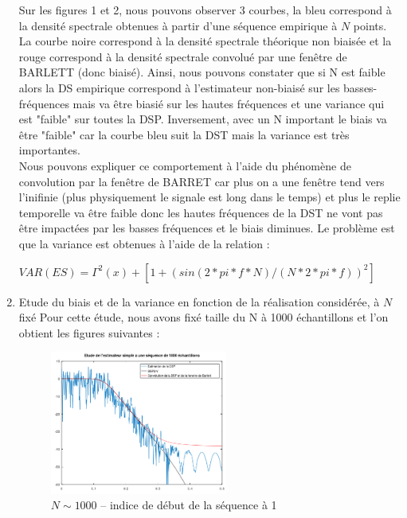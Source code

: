 \documentclass{article}
\begin{document}
\begin{enumerate}
Sur les figures 1 et 2, nous pouvons observer 3 courbes, la bleu correspond à la densité spectrale obtenues à partir d'une séquence empirique à $N$ points. La courbe noire correspond à la densité spectrale théorique non biaisée et la rouge correspond à la densité spectrale convolué par une fenêtre de BARLETT (donc biaisé). 
Ainsi, nous pouvons constater que si N est faible alors la DS empirique correspond à l'estimateur non-biaisé sur les basses-fréquences mais va être biasié sur les hautes fréquences et une variance qui est "faible" sur toutes la DSP.
Inversement, avec un N important le biais va être "faible" car la courbe bleu suit la DST mais la variance est très importantes. \\
Nous pouvons expliquer ce comportement à l'aide du phénomène de convolution par la fenêtre de BARRET car plus on a une fenêtre tend vers l'inifinie (plus physiquement le signale est long dans le temps) et plus le replie temporelle va être faible donc les hautes fréquences de la DST ne vont pas être impactées par les basses fréquences et le biais diminues. Le problème est que la variance est obtenues à l'aide de la relation :\\
\centerline{$VAR(ES) = \Gamma^2(x) + [1+(sin(2*pi*f*N)/(N*2*pi*f))^2]$}
 
\newline

\item Etude du biais et de la variance en fonction de la réalisation considérée, à $N$ fixé 
\newline
Pour cette étude, nous avons fixé taille du N à 1000 échantillons et l'on obtient les figures suivantes : 

\begin{figure}[h]

\centerline{\includegraphics[width=0.55\textwidth]{images/casESN1000.png}}
\caption{$N \sim 1000$ -- indice de début de la séquence à 1}
\end{figure}


\end{enumerate}
\end{document}
